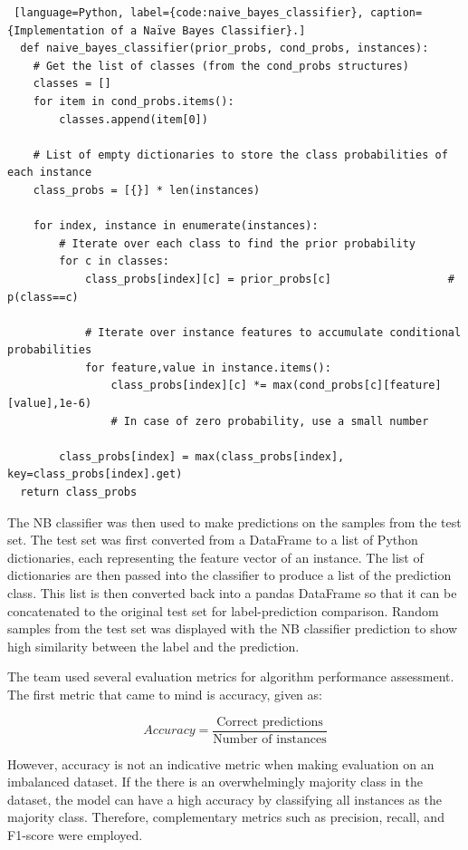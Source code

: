 \documentclass[a4paper]{article}
\begin{document}
\begin{lstlisting} [language=Python, label={code:naive_bayes_classifier}, caption={Implementation of a Naïve Bayes Classifier}.]
  def naive_bayes_classifier(prior_probs, cond_probs, instances):
    # Get the list of classes (from the cond_probs structures)
    classes = []
    for item in cond_probs.items():
        classes.append(item[0])

    # List of empty dictionaries to store the class probabilities of each instance
    class_probs = [{}] * len(instances)                                        
    
    for index, instance in enumerate(instances):
        # Iterate over each class to find the prior probability 
        for c in classes:
            class_probs[index][c] = prior_probs[c]                  # p(class==c)

            # Iterate over instance features to accumulate conditional probabilities
            for feature,value in instance.items():
                class_probs[index][c] *= max(cond_probs[c][feature][value],1e-6)       
                # In case of zero probability, use a small number
        
        class_probs[index] = max(class_probs[index], key=class_probs[index].get)
  return class_probs
\end{lstlisting}

The NB classifier was then used to make predictions on the samples from the test set. The test set was first converted from a DataFrame to a list of Python dictionaries, each representing the feature vector of an instance. The list of dictionaries are then passed into the classifier to produce a list of the prediction class. This list is then converted back into a pandas DataFrame so that it can be concatenated to the original test set for label-prediction comparison. Random samples from the test set was displayed with the NB classifier prediction to show high similarity between the label and the prediction.

The team used several evaluation metrics for algorithm performance assessment. The first metric that came to mind is accuracy, given as:

\begin{equation}
  Accuracy = \frac{\text{Correct predictions}}{\text{Number of instances}}
\end{equation}

However, accuracy is not an indicative metric when making evaluation on an imbalanced dataset. If the there is an overwhelmingly majority class in the dataset, the model can have a high accuracy by classifying all instances as the majority class. Therefore, complementary metrics such as precision, recall, and F1-score were employed. 
\end{document}
